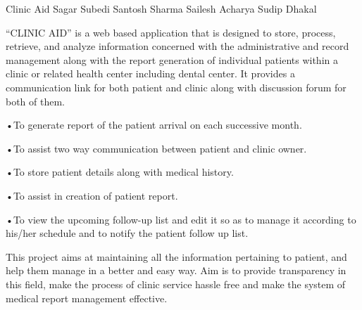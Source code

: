  \begin{conf-abstract}[]
 {Clinic Aid}
 { Sagar Subedi
 	Santosh Sharma
 	Sailesh Acharya
 	Sudip Dhakal
 }
{}

“CLINIC AID” is a web based application that is designed to store, process, retrieve, and analyze information concerned with the administrative and record management along with the report generation of individual patients within a clinic or related health center including dental center. It provides a communication link for both patient and clinic along with discussion forum for both of them.

•To generate report of the patient arrival on each successive month.  

•To assist two way communication between patient and clinic owner. 
 
•To store patient details along with medical history.  

•To assist in creation of patient report.  

•To view the upcoming follow-up list and edit it so as to manage it               according to his/her schedule and to notify the patient follow up list.   

This project aims at maintaining all the information pertaining to patient, and help them manage in a better and easy way. Aim is to provide transparency in this field, make the process of clinic service hassle free and make the system of medical report management effective.

\end{conf-abstract}